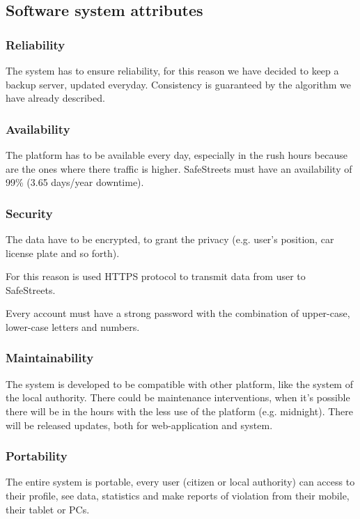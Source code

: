 \subsection{Software system attributes}
\subsubsection{Reliability}
The system has to ensure reliability, for this reason we have decided to keep a backup server, updated everyday.
Consistency is guaranteed by the algorithm we have already described.   

\subsubsection{Availability}
The platform has to be available every day, especially in the rush hours because are the ones where there traffic is higher.
 SafeStreets must have an availability of 99\% (3.65 days/year downtime).
 
\subsubsection{Security}
The data have to be encrypted, to grant the privacy (e.g. user's position, car license plate and so forth). 

For this reason is used HTTPS protocol to transmit data from user to SafeStreets.

Every account must have a strong password with the combination of upper-case, lower-case letters and numbers.

\subsubsection{Maintainability}
The system is developed to be compatible with other platform, like the system of the local authority.
There could be maintenance interventions, when it's possible there will be in the hours with the less use of the platform (e.g. midnight).
There will be released updates, both for web-application and system.

\subsubsection{Portability}
The entire system is portable, every user (citizen or local authority) can access to their profile, see data, statistics and make reports of violation from their mobile, their tablet or PCs.

